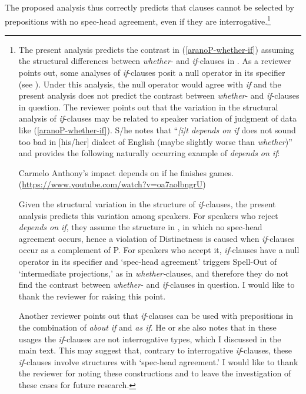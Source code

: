 \documentclass[output=paper]{langscibook}
\begin{document}
\noindent The proposed analysis thus correctly predicts that clauses cannot be selected by prepositions with no spec-head agreement, even if they are interrogative.\footnote{The present analysis predicts the contrast in (\ref{aranoP-whether-if}) assuming the structural differences between \emph{whether}- and \emph{if}-clauses in . As a reviewer points out, some analyses of \emph{if}-clauses posit a null operator in its specifier (see \citealt{Larson1985On-the-Syntax-o, Han2004The-Syntax-of-W, Wu2020Why-if-or-not-b}). Under this analysis, the null operator would agree with \emph{if} and the present analysis does not predict the contrast between \emph{whether}- and \emph{if}-clauses in question. The reviewer points out that the variation in the structural analysis of \emph{if}-clauses may be related to speaker variation of judgment of data like (\ref{aranoP-whether-if}). S/he notes that ``\emph{[i]t depends on if} does not sound too bad in [his/her] dialect of English (maybe slightly worse than \emph{whether})'' and provides the following naturally occurring example of \emph{depends on if}:


\ea 
Carmelo Anthony's impact depends on if he finishes games. \\
{\normalfont(\url{https://www.youtube.com/watch?v=oa7aolbngrU})}
\z

\noindent Given the structural variation in the structure of \emph{if}-clauses, the present analysis predicts this variation among speakers. For speakers who reject \emph{depends on if}, they assume the structure in , in which no spec-head agreement occurs, hence a violation of Distinctness is caused when \emph{if}-clauses occur as a complement of P\@. For speakers who accept it, \emph{if}-clauses have a null operator in its specifier and `spec-head agreement' triggers Spell-Out of  `intermediate projections,' as in \emph{whether-}clauses, and therefore they do not find the contrast between \emph{whether}- and \emph{if}-clauses in question. I would like to thank the reviewer for raising this point.

Another reviewer points out that \emph{if}-clauses can be used with prepositions in the combination of \emph{about if} and \emph{as if}. He or she also notes that in these usages the \emph{if}-clauses are not interrogative types, which I discussed in the main text. This may suggest that, contrary to interrogative \emph{if}-clauses, these \emph{if}-clauses involve structures with `spec-head agreement.' I would like to thank the reviewer for noting these constructions and to leave the investigation of these cases for future research.} 
\end{document}
